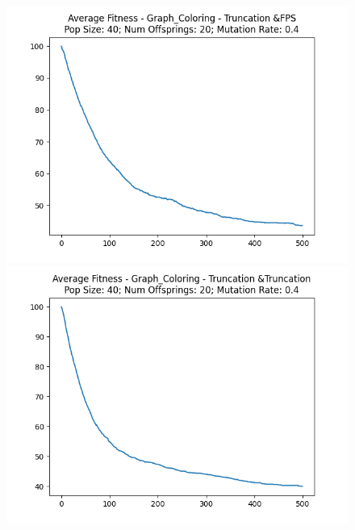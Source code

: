 \documentclass[12pt]{report}
\theoremstyle{mytheoremstyle}
\theoremstyle{mytheoremstyle}
\theoremstyle{myproblemstyle}
\begin{document}
\begin{figure}[!]
\begin{minipage}{0.4\textwidth}
		\includegraphics[width=\linewidth]{../Analysis/ASF_Graph_Coloring_3_0_40_20.png}
	\end{minipage}
	\hspace{\fill}
	\begin{minipage}{0.4\textwidth}
		\includegraphics[width=\linewidth]{../Analysis/ASF_Graph_Coloring_3_3_40_20.png}
	\end{minipage}
	\vspace*{1cm}
	\begin{minipage}{0.4\textwidth}

\end{minipage}
\end{figure}
\end{document}
